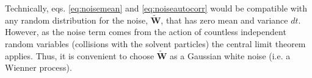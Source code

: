 \documentclass[ twoside,openright,titlepage,numbers=noenddot,%
headinclude,footinclude,cleardoublepage=empty,abstract=on,
BCOR=5mm,paper=a4,fontsize=11pt, dvipsnames
]{scrreprt}
\renewcommand{\vec}[1]{\bm{#1}}
\newcommand{\noise}{\widetilde{W}}
\newcommand{\pvel}{u}
\begin{document}
Technically, eqs. \eqref{eq:noisemean} and \eqref{eq:noiseautocorr} would be compatible with any random distribution for the noise, $\vec{\noise}$, that has zero mean and variance $dt$. However, as the noise term comes from the action of countless independent random variables (collisions with the solvent particles) the central limit theorem\cite{Feller1968} applies. Thus, it is convenient to choose $\vec{\noise}$ as a Gaussian white noise (i.e. a Wienner process)\cite{dunweg1991}.

%
\end{document}
